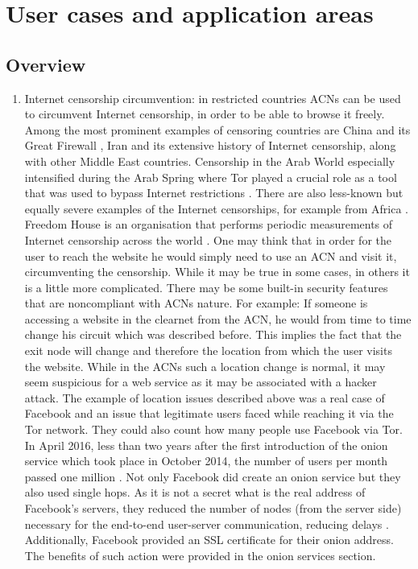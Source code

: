 \chapter{User cases and application areas}

\section{Overview}
\begin{enumerate}
    \item Internet censorship circumvention: in restricted countries ACNs can be used to circumvent Internet censorship, in order to be able to browse it freely. Among the most prominent examples of censoring countries are China and its Great Firewall \cite{gfw-china}, Iran and its extensive history of Internet censorship, along with other Middle East countries. Censorship in the Arab World especially intensified during the Arab Spring where Tor played a crucial role as a tool that was used to bypass Internet restrictions \cite{arab-spring}. There are also less-known but equally severe examples of the Internet censorships, for example from Africa \cite{africa}. Freedom House is an organisation that performs periodic measurements of Internet censorship across the world \cite{freedomhouse_internet}.
    One may think that in order for the user to reach the website he would simply need to use an ACN and visit it, circumventing the censorship. While it may be true in some cases, in others it is a little more complicated. There may be some built-in security features that are noncompliant with ACNs nature. For example: If someone is accessing a website in the clearnet from the ACN, he would from time to time change his circuit which was described before. This implies the fact that the exit node will change and therefore the location from which the user visits the website. While in the ACNs such a location change is normal, it may seem suspicious for a web service as it may be associated with a hacker attack.
    The example of location issues described above was a real case of Facebook and an issue that legitimate users faced while reaching it via the Tor network. They could also count how many people use Facebook via Tor. In April 2016, less than two years after the first introduction of the onion service which took place in October 2014, the number of users per month passed one million \cite{facebook-tor-note}. Not only Facebook did create an onion service but they also used single hops. As it is not a secret what is the real address of Facebook's servers, they reduced the number of nodes (from the server side) necessary for the end-to-end user-server communication, reducing delays \cite{facebook-tor}. Additionally, Facebook provided an SSL certificate for their onion address. The benefits of such action were provided in the onion services section.

\end{enumerate}
